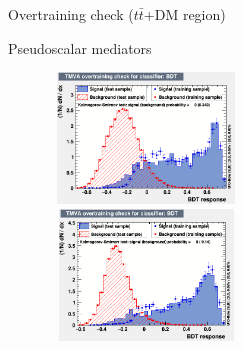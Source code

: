 \documentclass[8pt]{beamer}
\begin{document}
\begin{frame}{Overtraining check ($t \bar t$+DM region)}
\vspace{-5pt}
\begin{block}{\centering Pseudoscalar mediators}\end{block} \vspace{-10pt}
\begin{figure}[htbp]
\centering
\begin{minipage}[b]{.49\textwidth}
\begin{center}
\includegraphics[width=5.2cm, height=3.5cm]{figs/overtraining_pseudo100_TTbar.png}
\end{center}
\end{minipage}\hfill
\begin{minipage}[b]{.49\textwidth}
\begin{center}
\includegraphics[width=5.2cm, height=3.5cm]{figs/overtraining_pseudo500_TTbar.png}
\end{center}
\end{minipage} \hfill
\end{figure} \vfill
\end{frame}
\end{document}
